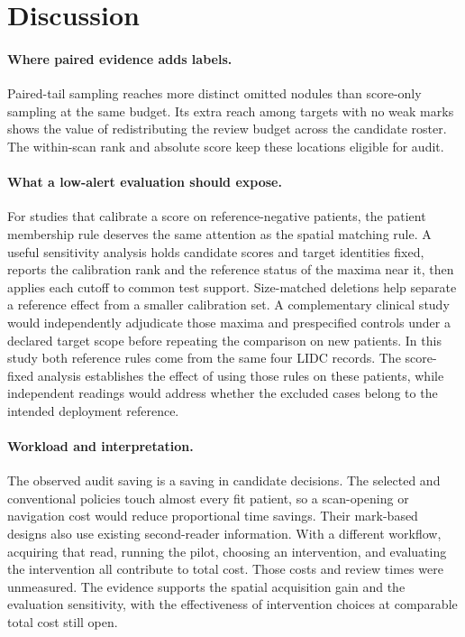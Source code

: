 \section{Discussion}

\paragraph{Where paired evidence adds labels.}
Paired-tail sampling reaches more distinct omitted nodules than score-only sampling at the same budget. Its extra reach among targets with no weak marks shows the value of redistributing the review budget across the candidate roster. The within-scan rank and absolute score keep these locations eligible for audit.

\paragraph{What a low-alert evaluation should expose.}
For studies that calibrate a score on reference-negative patients, the patient membership rule deserves the same attention as the spatial matching rule. A useful sensitivity analysis holds candidate scores and target identities fixed, reports the calibration rank and the reference status of the maxima near it, then applies each cutoff to common test support. Size-matched deletions help separate a reference effect from a smaller calibration set. A complementary clinical study would independently adjudicate those maxima and prespecified controls under a declared target scope before repeating the comparison on new patients. In this study both reference rules come from the same four LIDC records. The score-fixed analysis establishes the effect of using those rules on these patients, while independent readings would address whether the excluded cases belong to the intended deployment reference.

\paragraph{Workload and interpretation.}
The observed audit saving is a saving in candidate decisions. The selected and conventional policies touch almost every fit patient, so a scan-opening or navigation cost would reduce proportional time savings. Their mark-based designs also use existing second-reader information. With a different workflow, acquiring that read, running the pilot, choosing an intervention, and evaluating the intervention all contribute to total cost. Those costs and review times were unmeasured. The evidence supports the spatial acquisition gain and the evaluation sensitivity, with the effectiveness of intervention choices at comparable total cost still open.

